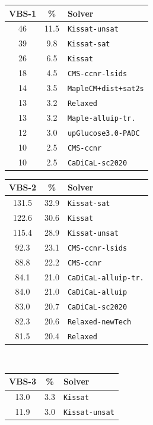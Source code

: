 \documentclass{elsarticle}
\newcommand{\solver}[1]{\texttt{#1}}
\begin{document}
\begin{table}
\smaller
\begin{tabular}{ccl}
\bf VBS-1 & \bf \% & \bf Solver \\
\hline
46 & 11.5 & \solver{Kissat-unsat} \\
39 & \phantom{0}9.8 & \solver{Kissat-sat} \\
26 & \phantom{0}6.5 & \solver{Kissat} \\
18 & \phantom{0}4.5 & \solver{CMS-ccnr-lsids} \\
14 & \phantom{0}3.5 & \solver{MapleCM+dist+sat2s} \\
13 & \phantom{0}3.2 & \solver{Relaxed} \\
13 & \phantom{0}3.2 & \solver{Maple-alluip-tr.} \\
12 & \phantom{0}3.0 & \solver{upGlucose3.0-PADC} \\
10 & \phantom{0}2.5 & \solver{CMS-ccnr} \\
10 & \phantom{0}2.5 & \solver{CaDiCaL-sc2020} \\
\end{tabular}\qquad%
\begin{tabular}{ccl}
\bf VBS-2 & \bf \% & \bf Solver \\
\hline
131.5 & 32.9 & \solver{Kissat-sat} \\
122.6 & 30.6 & \solver{Kissat} \\
115.4 & 28.9 & \solver{Kissat-unsat} \\
\phantom{0}92.3 & 23.1 & \solver{CMS-ccnr-lsids} \\
\phantom{0}88.8 & 22.2 & \solver{CMS-ccnr} \\
\phantom{0}84.1 & 21.0 & \solver{CaDiCaL-alluip-tr.} \\
\phantom{0}84.0 & 21.0 & \solver{CaDiCaL-alluip} \\
\phantom{0}83.0 & 20.7 & \solver{CaDiCaL-sc2020} \\
\phantom{0}82.3 & 20.6 & \solver{Relaxed-newTech} \\
\phantom{0}81.5 & 20.4 & \solver{Relaxed} \\
\end{tabular}%
~\\[1em]
\begin{tabular}{ccl}
\bf VBS-3 & \bf \% & \bf Solver \\
\hline
13.0 & 3.3 & \solver{Kissat} \\
11.9 & 3.0 & \solver{Kissat-unsat} \\

\end{tabular}
\end{table}
\end{document}
